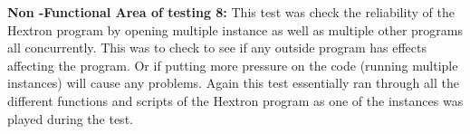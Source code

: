 \documentclass[12pt, titlepage]{article}
\begin{document}
\textbf{Non -Functional Area of testing 8:} This test was check the reliability of the Hextron program by opening multiple instance as well as multiple other programs all concurrently. This was to check to see if any outside program has effects affecting the program. Or if putting more pressure on the code (running multiple instances) will cause any problems. Again this test essentially ran through all the different functions and scripts of the Hextron program as one of the instances was played during the test. \\






\end{document}
